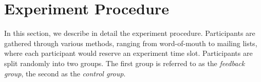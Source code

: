 

%

\section{Experiment Procedure}
\label{sec:meth-experiment-structure}
In this section, we describe in detail the experiment procedure. Participants are gathered through various methods, ranging from word-of-mouth to mailing lists, where each participant would reserve an experiment time slot. Participants are split randomly into two groups. The first group is referred to as the \emph{feedback group}, the second as the \emph{control group}. 



